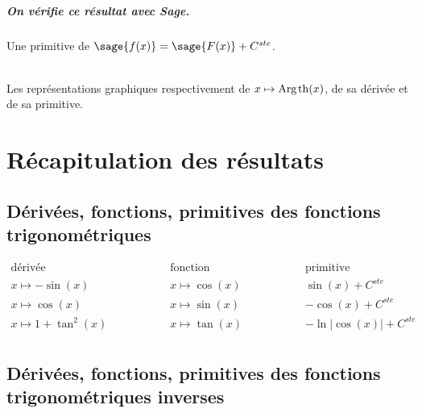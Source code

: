 \documentclass[a4paper,12pt]{report}
\renewcommand{\tanh}{\mathop{\mathrm{th}}}
\renewcommand{\arg}{\mathop{\mathrm{Arg}}}
\begin{document}
\paragraph{On vérifie ce résultat avec Sage.}

Une primitive de $\sage{f(x)} = \sage{F(x)} + C^{ste} $.

\begin{center}
\\
Les représentations graphiques respectivement de $x \mapsto \arg\mspace{-1mu}\tanh(x)$, de sa dérivée et de sa primitive.
\end{center}


\chapter{Récapitulation des résultats}

\section{Dérivées, fonctions, primitives des fonctions trigonométriques}

\begin{align*}
\textrm{dérivée} \hspace{2cm} & \textrm{fonction} \hspace{2cm} & \textrm{primitive}  \\ 
x \mapsto -\sin(x) \hspace{2cm} & x \mapsto \cos(x) \hspace{2cm} & \sin(x) + C^{ste}  \\
x \mapsto \cos(x) \hspace{2cm} & x \mapsto \sin(x) \hspace{2cm} & -\cos(x) + C^{ste}   \\
x \mapsto 1 + \tan\nolimits^2(x) \hspace{2cm} & x \mapsto \tan(x) \hspace{2cm} & -\ln\left| \cos(x)\right| + C^{ste} \\
\end{align*}


\section{Dérivées, fonctions, primitives des fonctions trigonométriques inverses}
\end{document}
